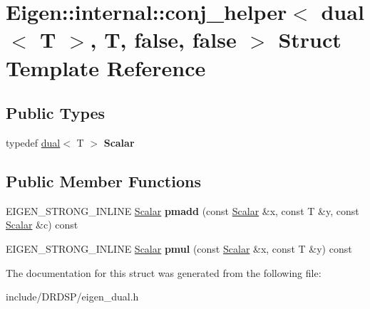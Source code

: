 \hypertarget{struct_eigen_1_1internal_1_1conj__helper_3_01dual_3_01_t_01_4_00_01_t_00_01false_00_01false_01_4}{\section{Eigen\-:\-:internal\-:\-:conj\-\_\-helper$<$ dual$<$ T $>$, T, false, false $>$ Struct Template Reference}
\label{struct_eigen_1_1internal_1_1conj__helper_3_01dual_3_01_t_01_4_00_01_t_00_01false_00_01false_01_4}
}
\subsection*{Public Types}
\begin{DoxyCompactItemize}
\item 
\hypertarget{struct_eigen_1_1internal_1_1conj__helper_3_01dual_3_01_t_01_4_00_01_t_00_01false_00_01false_01_4_ad0d73cc49ae948fa321df35eddf377fb}{typedef \hyperlink{struct_d_r_d_s_p_1_1dual}{dual}$<$ T $>$ {\bfseries Scalar}}\label{struct_eigen_1_1internal_1_1conj__helper_3_01dual_3_01_t_01_4_00_01_t_00_01false_00_01false_01_4_ad0d73cc49ae948fa321df35eddf377fb}

\end{DoxyCompactItemize}
\subsection*{Public Member Functions}
\begin{DoxyCompactItemize}
\item 
\hypertarget{struct_eigen_1_1internal_1_1conj__helper_3_01dual_3_01_t_01_4_00_01_t_00_01false_00_01false_01_4_a996af9ffffc14caf40155c928e454586}{E\-I\-G\-E\-N\-\_\-\-S\-T\-R\-O\-N\-G\-\_\-\-I\-N\-L\-I\-N\-E \hyperlink{struct_d_r_d_s_p_1_1dual}{Scalar} {\bfseries pmadd} (const \hyperlink{struct_d_r_d_s_p_1_1dual}{Scalar} \&x, const T \&y, const \hyperlink{struct_d_r_d_s_p_1_1dual}{Scalar} \&c) const }\label{struct_eigen_1_1internal_1_1conj__helper_3_01dual_3_01_t_01_4_00_01_t_00_01false_00_01false_01_4_a996af9ffffc14caf40155c928e454586}

\item 
\hypertarget{struct_eigen_1_1internal_1_1conj__helper_3_01dual_3_01_t_01_4_00_01_t_00_01false_00_01false_01_4_aec3fee9fe95243ef3eea5f459978c391}{E\-I\-G\-E\-N\-\_\-\-S\-T\-R\-O\-N\-G\-\_\-\-I\-N\-L\-I\-N\-E \hyperlink{struct_d_r_d_s_p_1_1dual}{Scalar} {\bfseries pmul} (const \hyperlink{struct_d_r_d_s_p_1_1dual}{Scalar} \&x, const T \&y) const }\label{struct_eigen_1_1internal_1_1conj__helper_3_01dual_3_01_t_01_4_00_01_t_00_01false_00_01false_01_4_aec3fee9fe95243ef3eea5f459978c391}

\end{DoxyCompactItemize}


The documentation for this struct was generated from the following file\-:\begin{DoxyCompactItemize}
\item 
include/\-D\-R\-D\-S\-P/eigen\-\_\-dual.\-h\end{DoxyCompactItemize}
